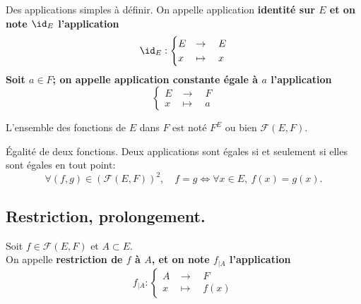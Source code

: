 \documentclass[11pt]{article}
\begin{document}
\begin{defi}{Des applications simples à définir.}{}
    On appelle application \bf{identité} sur $E$ et on note $\id_E$ l'application
    \begin{equation*}
        \id_E:\begin{cases}
            E&\to\quad E\\
            x&\mapsto\quad x
        \end{cases}
    \end{equation*}
    Soit $a\in F$; on appelle \bf{application constante} égale à $a$ l'application
    \begin{equation*}
        \begin{cases}
            E&\to\quad F\\
            x&\mapsto\quad a
        \end{cases}
    \end{equation*}
\end{defi}

\begin{nota}{}{}
    L'ensemble des fonctions de $E$ dans $F$ est noté $F^E$ ou bien $\mathcal{F}(E,F)$.
\end{nota}

\begin{prop}{Égalité de deux fonctions.}{}
    Deux applications sont égales si et seulement si elles sont égales en tout point:
    \begin{equation*}
        \forall (f,g)\in(\mathcal{F}(E,F))^2,\quad f=g\iff \forall x \in E,~f(x)=g(x).
    \end{equation*}
\end{prop}

\subsection{Restriction, prolongement.}

\begin{defi}{}{}
    Soit $f\in\mathcal{F}(E,F)$ et $A\subset E$.\\
    On appelle \bf{restriction} de $f$ à $A$, et on note $f_{|A}$ l'application
    \begin{equation*}
        f_{|A}:\begin{cases}
            A&\to\quad F\\
            x&\mapsto\quad f(x)
        \end{cases}
    \end{equation*}
\end{defi}
\end{document}
